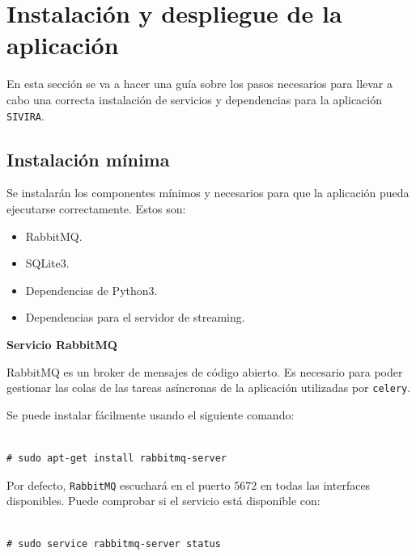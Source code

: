 \section{Instalación y despliegue de la aplicación} \label{anex:desp}

En esta sección se va a hacer una guía sobre los pasos necesarios para llevar a cabo una correcta instalación de servicios y dependencias para la aplicación \texttt{SIVIRA}.

\subsection{Instalación mínima}

Se instalarán los componentes mínimos y necesarios para que la aplicación pueda ejecutarse correctamente. Estos son:

\begin{itemize}
\item RabbitMQ.
\item SQLite3.
\item Dependencias de Python3.
\item Dependencias para el servidor de streaming.
\end{itemize}


\textbf{Servicio RabbitMQ}

RabbitMQ es un broker de mensajes de código abierto. Es necesario para poder gestionar las colas de las tareas asíncronas de la aplicación utilizadas por \texttt{celery}.

Se puede instalar fácilmente usando el siguiente comando:

\vspace{-1.4cm}

\begin{verbatim}

# sudo apt-get install rabbitmq-server

\end{verbatim}

\vspace{-1.4cm}

Por defecto, \texttt{RabbitMQ} escuchará en el puerto 5672 en todas las interfaces disponibles. Puede comprobar si el servicio está disponible con:


\vspace{-1.4cm}

\begin{verbatim}

# sudo service rabbitmq-server status

\end{verbatim}

